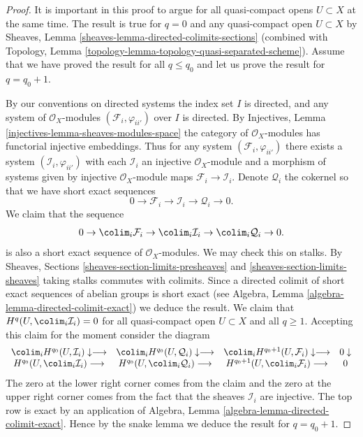 \begin{proof}

It is important in this proof to argue for all quasi-compact opens
$U \subset X$ at the same time.
The result is true for $q = 0$ and any quasi-compact open $U \subset X$ by
Sheaves, Lemma \ref{sheaves-lemma-directed-colimits-sections}
(combined with
Topology, Lemma \ref{topology-lemma-topology-quasi-separated-scheme}).
Assume that we have proved the result for all $q \leq q_0$ and let
us prove the result for $q = q_0 + 1$.

\medskip\noindent
By our conventions on directed systems the index set $I$ is directed,
and any system of $\mathcal{O}_X$-modules $(\mathcal{F}_i, \varphi_{ii'})$
over $I$ is directed.
By Injectives, Lemma \ref{injectives-lemma-sheaves-modules-space} the category
of $\mathcal{O}_X$-modules has functorial injective embeddings.
Thus for any system $(\mathcal{F}_i, \varphi_{ii'})$ there exists a
system $(\mathcal{I}_i, \varphi_{ii'})$ with each $\mathcal{I}_i$ an
injective $\mathcal{O}_X$-module and a morphism of systems given
by injective $\mathcal{O}_X$-module maps
$\mathcal{F}_i \to \mathcal{I}_i$. Denote $\mathcal{Q}_i$ the
cokernel so that we have short exact sequences
$$
0 \to
\mathcal{F}_i \to
\mathcal{I}_i \to
\mathcal{Q}_i \to 0.
$$
We claim that the sequence
$$
0 \to
\colim_i \mathcal{F}_i \to
\colim_i \mathcal{I}_i \to
\colim_i \mathcal{Q}_i \to 0.
$$
is also a short exact sequence of $\mathcal{O}_X$-modules.
We may check this on stalks. By
Sheaves, Sections \ref{sheaves-section-limits-presheaves}
and \ref{sheaves-section-limits-sheaves}
taking stalks commutes with colimits. Since a directed colimit
of short exact sequences of abelian groups is short exact
(see Algebra, Lemma \ref{algebra-lemma-directed-colimit-exact})
we deduce the result. We claim that
$H^q(U, \colim_i \mathcal{I}_i) = 0$ for all quasi-compact
open $U \subset X$ and all $q \geq 1$. Accepting this claim
for the moment consider the diagram
$$
\begin{array}{cccc}\colim_i H^{q_0}(U, \mathcal{I}_i) \downarrow\longrightarrow & \colim_i H^{q_0}(U, \mathcal{Q}_i) \downarrow\longrightarrow & \colim_i H^{q_0 + 1}(U, \mathcal{F}_i) \downarrow\longrightarrow & 0 \downarrow \\ H^{q_0}(U, \colim_i \mathcal{I}_i) \longrightarrow & H^{q_0}(U, \colim_i \mathcal{Q}_i) \longrightarrow & H^{q_0 + 1}(U, \colim_i \mathcal{F}_i) \longrightarrow & 0\end{array}
$$
The zero at the lower right corner comes from the claim and the
zero at the upper right corner comes from the fact that the sheaves
$\mathcal{I}_i$ are injective.
The top row is exact by an application of
Algebra, Lemma \ref{algebra-lemma-directed-colimit-exact}.
Hence by the snake lemma we deduce the
result for $q = q_0 + 1$.


\end{proof}
